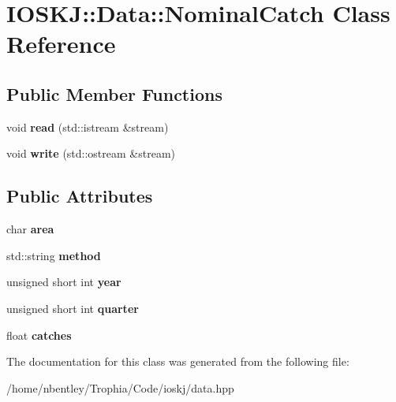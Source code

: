 \hypertarget{classIOSKJ_1_1Data_1_1NominalCatch}{\section{I\-O\-S\-K\-J\-:\-:Data\-:\-:Nominal\-Catch Class Reference}
\label{classIOSKJ_1_1Data_1_1NominalCatch}
}
\subsection*{Public Member Functions}
\begin{DoxyCompactItemize}
\item 
\hypertarget{classIOSKJ_1_1Data_1_1NominalCatch_a951b91a43b44fe8e0ade88245627a2ad}{void {\bfseries read} (std\-::istream \&stream)}\label{classIOSKJ_1_1Data_1_1NominalCatch_a951b91a43b44fe8e0ade88245627a2ad}

\item 
\hypertarget{classIOSKJ_1_1Data_1_1NominalCatch_ae32b6f662319fa27352d89e7f5918e5a}{void {\bfseries write} (std\-::ostream \&stream)}\label{classIOSKJ_1_1Data_1_1NominalCatch_ae32b6f662319fa27352d89e7f5918e5a}

\end{DoxyCompactItemize}
\subsection*{Public Attributes}
\begin{DoxyCompactItemize}
\item 
\hypertarget{classIOSKJ_1_1Data_1_1NominalCatch_a44e0f37b2fca0167eb89c4eea98785f3}{char {\bfseries area}}\label{classIOSKJ_1_1Data_1_1NominalCatch_a44e0f37b2fca0167eb89c4eea98785f3}

\item 
\hypertarget{classIOSKJ_1_1Data_1_1NominalCatch_a7c81dbf0ee1c934b6dad81477365a04e}{std\-::string {\bfseries method}}\label{classIOSKJ_1_1Data_1_1NominalCatch_a7c81dbf0ee1c934b6dad81477365a04e}

\item 
\hypertarget{classIOSKJ_1_1Data_1_1NominalCatch_a2a39b5de33deffc3bdfd20acf03be16b}{unsigned short int {\bfseries year}}\label{classIOSKJ_1_1Data_1_1NominalCatch_a2a39b5de33deffc3bdfd20acf03be16b}

\item 
\hypertarget{classIOSKJ_1_1Data_1_1NominalCatch_a480209d8d8f192a933a38aa872733131}{unsigned short int {\bfseries quarter}}\label{classIOSKJ_1_1Data_1_1NominalCatch_a480209d8d8f192a933a38aa872733131}

\item 
\hypertarget{classIOSKJ_1_1Data_1_1NominalCatch_afdcdb166bea101d81920b8508d785ebe}{float {\bfseries catches}}\label{classIOSKJ_1_1Data_1_1NominalCatch_afdcdb166bea101d81920b8508d785ebe}

\end{DoxyCompactItemize}


The documentation for this class was generated from the following file\-:\begin{DoxyCompactItemize}
\item 
/home/nbentley/\-Trophia/\-Code/ioskj/data.\-hpp\end{DoxyCompactItemize}
